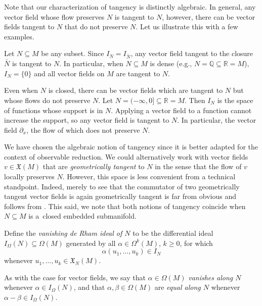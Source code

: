 \documentclass[10pt,a4paper]{amsart}
\numberwithin{equation}{section}
\newcommand{\X}{\mathfrak{X}}
\renewcommand{\subset}{\subseteq}
\begin{document}
Note that our characterization of tangency is distinctly algebraic. In general, any vector field whose flow preserves $N$ is tangent to $N$, however, there can be vector fields tangent to $N$ that do not preserve $N$. Let us illustrate this with a few examples.

\begin{Remark}
	Let $N\subset M$ be any subset. Since $I_N=I_{\bar N}$, any vector field tangent to the closure~$\bar N$ is tangent to $N$. In particular, when $N\subset M$ is dense (e.g., $N=\mathbb Q\subset  \mathbb R=M$), $I_N=\{0\}$ and all vector fields on $M$ are tangent to $N$.
\end{Remark}

\begin{Example}
	Even when $N$ is closed, there can be vector fields which are tangent to $N$ but whose flows do not preserve $N$. Let $N=(-\infty,0]\subset \mathbb R=M$. Then $I_N$ is the space of functions whose support is in $N$. Applying a vector field to a function cannot increase the support, so any vector field is tangent to $N$. In particular, the vector field $\partial_x$, the flow of which does not preserve $N$.
\end{Example}

\begin{Remark}
	We have chosen the algebraic notion of tangency since it is better adapted for the context of observable reduction. We could alternatively work with vector fields $v\in\X(M)$ that are \emph{geometrically tangent} to $N$ in the sense that the flow of $v$ locally preserves $N$. However, this space is less convenient from a technical standpoint. Indeed, merely to see that the commutator of two geometrically tangent vector fields is again geometrically tangent is far from obvious and follows from \cite{Sussmann73}. This said, we note that both notions of tangency coincide when $N\subset M$ is a~closed embedded submanifold.
\end{Remark}

\begin{Definition}\label{def:vanishing_de_Rham_ideal}
	Define the \emph{vanishing de Rham ideal of $N$} to be the differential ideal $I_\Omega(N)\subset\Omega(M)$ generated by all $\alpha\in\Omega^k(M)$, $k\geq 0$, for which
	\[
		\alpha(u_1,\dots,u_k) \in I_N
	\]
	whenever $u_1,\dots,u_k\in\X_N(M)$.
\end{Definition}

As with the case for vector fields, we say that $\alpha\in\Omega(M)$ \emph{vanishes along $N$} whenever ${\alpha\in I_\Omega(N)}$, and that $\alpha,\beta\in\Omega(M)$ are \emph{equal along $N$} whenever $\alpha-\beta\in I_\Omega(N)$.
\end{document}
